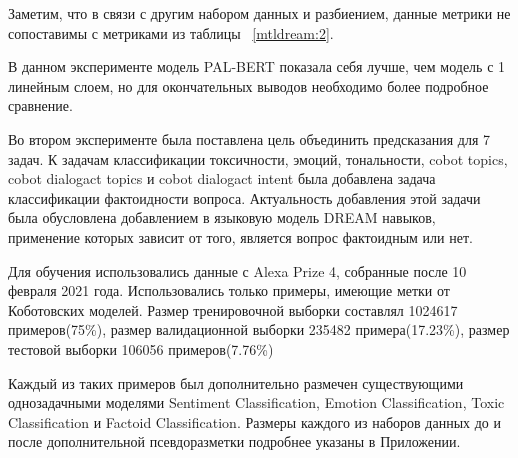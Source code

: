 \begin{table}[htbp]
\centering
\caption {Accuracy(f1) с диалоговой историей для многозадачной модели с 1 линейным слоем, только Коботовские задачи}
\label{mtldream:3}%
\end{table}

Заметим, что в связи с другим набором данных и разбиением, данные метрики не сопоставимы с метриками из таблицы ~\ref{mtldream:2}.
 
В данном эксперименте модель PAL-BERT показала себя лучше, чем модель с 1 линейным слоем, но для окончательных выводов необходимо более подробное сравнение.

Во втором эксперименте была поставлена цель объединить предсказания для 7 задач. К задачам классификации токсичности, эмоций, тональности, cobot topics, cobot dialogact topics и cobot dialogact intent была добавлена задача классификации фактоидности вопроса. Актуальность добавления этой задачи была обусловлена добавлением в языковую модель DREAM навыков, применение которых зависит от того, является вопрос фактоидным или нет.

Для обучения использовались данные с Alexa Prize 4, собранные после 10 февраля 2021 года. Использовались только примеры, имеющие метки от Коботовских моделей. Размер тренировочной выборки составлял 1024617 примеров(75\%), размер валидационной выборки 235482 примера(17.23\%), размер тестовой выборки 106056 примеров(7.76\%)

Каждый из таких примеров был дополнительно размечен существующими однозадачными моделями Sentiment Classification, Emotion Classification, Toxic Classification и Factoid Classification. Размеры каждого из наборов данных до и после дополнительной псевдоразметки подробнее указаны в Приложении. 

